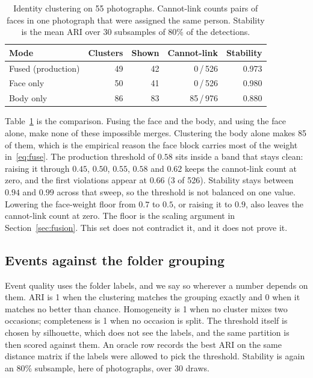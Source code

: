 \documentclass[conference]{IEEEtran}
\begin{document}
\begin{table}[t]
\caption{Identity clustering on 55 photographs. Cannot-link counts pairs of
faces in one photograph that were assigned the same person. Stability is the
mean ARI over 30 subsamples of 80\% of the detections.}
\label{tab:identity}
\centering
\scriptsize
\begin{tabular}{@{}lrrrr@{}}
\toprule
Mode & Clusters & Shown & Cannot-link & Stability \\
\midrule
Fused (production) & 49 & 42 & 0\,/\,526 & 0.973 \\
Face only & 50 & 41 & 0\,/\,526 & 0.980 \\
Body only & 86 & 83 & 85\,/\,976 & 0.880 \\
\bottomrule
\end{tabular}
\end{table}

Table~\ref{tab:identity} is the comparison. Fusing the face and the body, and
using the face alone, make none of these impossible merges. Clustering the
body alone makes 85 of them, which is the empirical reason the face block
carries most of the weight in~\eqref{eq:fuse}. The production threshold of
$0.58$ sits inside a band that stays clean: raising it through $0.45$, $0.50$,
$0.55$, $0.58$ and $0.62$ keeps the cannot-link count at zero, and the first
violations appear at $0.66$ (3 of 526). Stability stays between $0.94$ and
$0.99$ across that sweep, so the threshold is not balanced on one value.
Lowering the face-weight floor from $0.7$ to $0.5$, or raising it to $0.9$,
also leaves the cannot-link count at zero. The floor is the scaling argument
in Section~\ref{sec:fusion}. This set does not contradict it, and it does not
prove it.

\subsection{Events against the folder grouping}
\label{sec:events-eval}

Event quality uses the folder labels, and we say so wherever a number depends
on them. ARI is 1 when the clustering matches the grouping exactly and 0 when
it matches no better than chance. Homogeneity is 1 when no cluster mixes two
occasions; completeness is 1 when no occasion is split. The threshold itself
is chosen by silhouette, which does not see the labels, and the same partition
is then scored against them. An oracle row records the best ARI on the same
distance matrix if the labels were allowed to pick the threshold. Stability is
again an 80\% subsample, here of photographs, over 30 draws.
\end{document}
